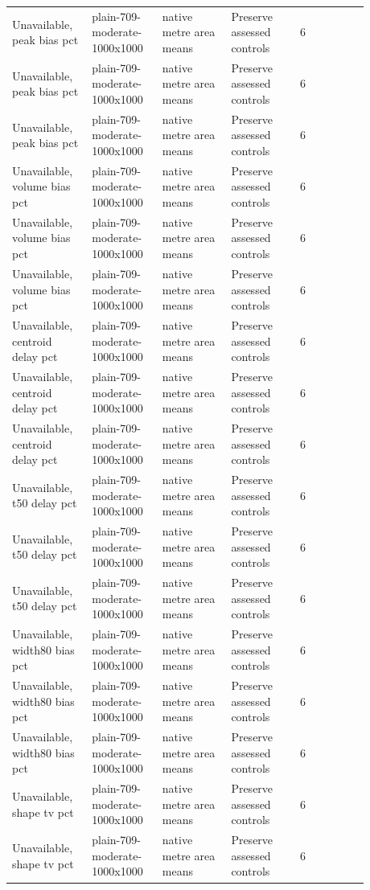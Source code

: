 \begin{longtable}{p{0.1760\linewidth}p{0.1760\linewidth}p{0.1760\linewidth}p{0.1760\linewidth}p{0.1760\linewidth}}
Unavailable, peak bias pct & plain-709-moderate-1000x1000 & native metre area means & Preserve assessed controls & 6 \\
Unavailable, peak bias pct & plain-709-moderate-1000x1000 & native metre area means & Preserve assessed controls & 6 \\
Unavailable, peak bias pct & plain-709-moderate-1000x1000 & native metre area means & Preserve assessed controls & 6 \\
Unavailable, volume bias pct & plain-709-moderate-1000x1000 & native metre area means & Preserve assessed controls & 6 \\
Unavailable, volume bias pct & plain-709-moderate-1000x1000 & native metre area means & Preserve assessed controls & 6 \\
Unavailable, volume bias pct & plain-709-moderate-1000x1000 & native metre area means & Preserve assessed controls & 6 \\
Unavailable, centroid delay pct & plain-709-moderate-1000x1000 & native metre area means & Preserve assessed controls & 6 \\
Unavailable, centroid delay pct & plain-709-moderate-1000x1000 & native metre area means & Preserve assessed controls & 6 \\
Unavailable, centroid delay pct & plain-709-moderate-1000x1000 & native metre area means & Preserve assessed controls & 6 \\
Unavailable, t50 delay pct & plain-709-moderate-1000x1000 & native metre area means & Preserve assessed controls & 6 \\
Unavailable, t50 delay pct & plain-709-moderate-1000x1000 & native metre area means & Preserve assessed controls & 6 \\
Unavailable, t50 delay pct & plain-709-moderate-1000x1000 & native metre area means & Preserve assessed controls & 6 \\
Unavailable, width80 bias pct & plain-709-moderate-1000x1000 & native metre area means & Preserve assessed controls & 6 \\
Unavailable, width80 bias pct & plain-709-moderate-1000x1000 & native metre area means & Preserve assessed controls & 6 \\
Unavailable, width80 bias pct & plain-709-moderate-1000x1000 & native metre area means & Preserve assessed controls & 6 \\
Unavailable, shape tv pct & plain-709-moderate-1000x1000 & native metre area means & Preserve assessed controls & 6 \\
Unavailable, shape tv pct & plain-709-moderate-1000x1000 & native metre area means & Preserve assessed controls & 6 \\

\end{longtable}
